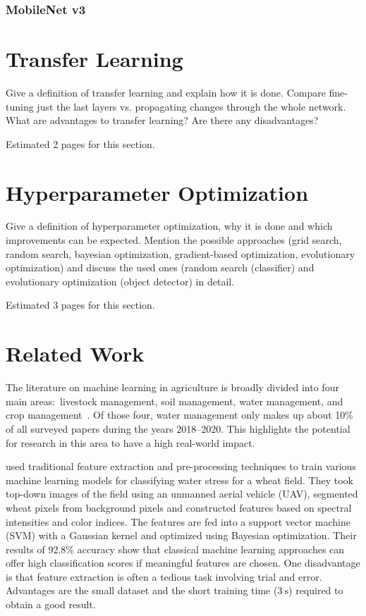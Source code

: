 \documentclass[draft,final]{vutinfth} %
\begin{document}
\subsubsection{MobileNet v3}
\label{sssec:theory-mobilenet-v3}



\section{Transfer Learning}
\label{sec:background-transfer-learning}

Give a definition of transfer learning and explain how it is
done. Compare fine-tuning just the last layers vs. propagating changes
through the whole network. What are advantages to transfer learning?
Are there any disadvantages?

Estimated 2 pages for this section.

\section{Hyperparameter Optimization}
\label{sec:background-hypopt}

Give a definition of hyperparameter optimization, why it is done and
which improvements can be expected. Mention the possible approaches
(grid search, random search, bayesian optimization, gradient-based
optimization, evolutionary optimization) and discuss the used ones
(random search (classifier) and evolutionary optimization (object
detector) in detail.

Estimated 3 pages for this section.

\section{Related Work}
\label{sec:related-work}

The literature on machine learning in agriculture is broadly divided
into four main areas:~livestock management, soil management, water
management, and crop management~\cite{benos2021}. Of those four, water
management only makes up about 10\% of all surveyed papers during the
years 2018--2020. This highlights the potential for research in this
area to have a high real-world impact.

\textcite{su2020} used traditional feature extraction and
pre-processing techniques to train various machine learning models for
classifying water stress for a wheat field. They took top-down images
of the field using an unmanned aerial vehicle (UAV), segmented wheat
pixels from background pixels and constructed features based on
spectral intensities and color indices. The features are fed into a
support vector machine (SVM) with a Gaussian kernel and optimized
using Bayesian optimization. Their results of 92.8\% accuracy show
that classical machine learning approaches can offer high
classification scores if meaningful features are chosen. One
disadvantage is that feature extraction is often a tedious task
involving trial and error. Advantages are the small dataset and the
short training time ($\qty{3}{\second}$) required to obtain a good
result.
\end{document}
